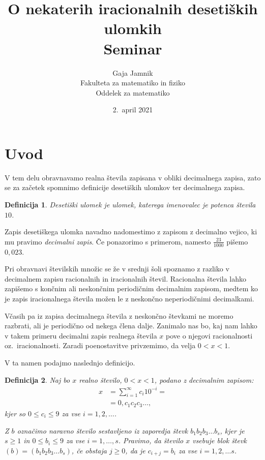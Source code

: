 \documentclass[a4paper,12pt]{article}
\title{O nekaterih iracionalnih desetiških ulomkih \\ 
\Large Seminar}
\author{Gaja Jamnik \\
Fakulteta za matematiko in fiziko \\
Oddelek za matematiko}
\date{2.\ april 2021}
\newtheorem{definicija}{Definicija}
\begin{document}


\maketitle



\section{Uvod}
V tem delu obravnavamo realna števila zapisana v obliki decimalnega zapisa,
zato se za začetek spomnimo definicije desetiških ulomkov ter decimalnega zapisa.

\begin{definicija}
    {\em Desetiški ulomek} je ulomek, katerega imenovalec je potenca števila $10$. 
\end{definicija}

Zapis desetiškega ulomka navadno
    nadomestimo z zapisom z decimalno vejico, ki mu pravimo {\em decimalni zapis}. Če ponazorimo s primerom, namesto 
    $ \frac{23}{1000}$ pišemo $0,023$.

Pri obravnavi številskih množic se že v srednji šoli spoznamo z razliko v decimalnem zapisu
racionalnih in iracionalnih števil. Racionalna števila lahko zapišemo
s končnim ali neskončnim periodičnim decimalnim zapisom, medtem ko je zapis iracionalnega števila možen 
le z neskončno neperiodičnimi decimalkami.

Včasih pa iz zapisa decimalnega števila z neskončno števkami ne moremo razbrati, ali je periodično od nekega člena dalje.
Zanimalo nas bo, kaj nam lahko v takem primeru decimalni zapis realnega števila $x$ pove o njegovi racionalnosti
oz.\ iracionalnosti.
Zaradi poenostavitve privzemimo, da velja $ 0 < x < 1$.

V ta namen podajmo naslednjo definicijo.

\begin{definicija}
    \label{defincija blokov}
    Naj bo $x$ realno število, $ 0 < x < 1$, podano z decimalnim zapisom: 
    \[ 
        \begin{split}
            x & = \sum^{\infty}_{i=1} c_i 10^{-i} = \\
            & = 0,c_1c_2c_3 \dots,
        \end{split}   
    \]
    kjer so $0 \leq c_i \leq 9$ za vse $i = 1, 2, \dots$.
    
    Z $b$ označimo naravno število sestavljeno iz zaporedja števk
    $b_1b_2b_3 \dots b_s$, 
    kjer je $s\geq 1$ in $0 \leq b_i \leq 9$ za vse $i = 1, \dots, s$.
    Pravimo, da število $x$ {\em vsebuje blok števk $(b) = (b_1b_2b_3 \dots b_s)$}, če obstaja $j \geq 0$, da je 
    $c_{i+j} = b_i$ za vse $i=1, 2, \dots s$.
\end{definicija}
\end{document}

